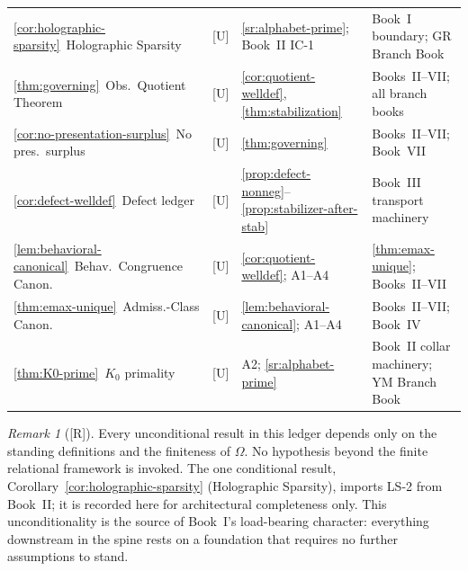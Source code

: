 \documentclass[12pt,oneside]{amsbook}
\theoremstyle{plain}
\theoremstyle{definition}
\theoremstyle{remark}
\newtheorem{remark}[theorem]{Remark}
\newcommand{\status}[1]{\textup{[#1]}}
\begin{document}
\begin{tabular}{@{}p{3.6cm}p{0.8cm}p{3.8cm}p{4.8cm}@{}}
\ref{cor:holographic-sparsity}\ Holographic Sparsity
  & [U] & \ref{sr:alphabet-prime}; Book~II IC-1
  & Book~I boundary; GR Branch Book \\

\ref{thm:governing}\ Obs.\ Quotient Theorem
  & [U] & \ref{cor:quotient-welldef}, \ref{thm:stabilization}
  & Books~II--VII; all branch books \\

\ref{cor:no-presentation-surplus}\ No pres.\ surplus
  & [U] & \ref{thm:governing}
  & Books~II--VII; Book~VII \\

\ref{cor:defect-welldef}\ Defect ledger
  & [U] & \ref{prop:defect-nonneg}--\ref{prop:stabilizer-after-stab}
  & Book~III transport machinery \\

\ref{lem:behavioral-canonical}\ Behav.\ Congruence Canon.
  & [U] & \ref{cor:quotient-welldef}; A1--A4
  & \ref{thm:emax-unique}; Books~II--VII \\

\ref{thm:emax-unique}\ Admiss.-Class Canon.
  & [U] & \ref{lem:behavioral-canonical}; A1--A4
  & Books~II--VII; Book~IV \\

\ref{thm:K0-prime}\ $K_0$ primality
  & [U] & A2; \ref{sr:alphabet-prime}
  & Book~II collar machinery; YM Branch Book \\
\hline
\end{tabular}
\renewcommand{\arraystretch}{1}

\medskip

\begin{remark}[\status{R}]
Every unconditional result in this ledger depends only on the
standing definitions and the finiteness of $\Omega$.  No hypothesis
beyond the finite relational framework is invoked.  The one
conditional result, Corollary~\ref{cor:holographic-sparsity}
(Holographic Sparsity), imports LS-2 from Book~II; it is recorded here
for architectural completeness only.  This unconditionality is the
source of Book~I's load-bearing character: everything downstream in
the spine rests on a foundation that requires no further assumptions
to stand.
\end{remark}
\end{document}
